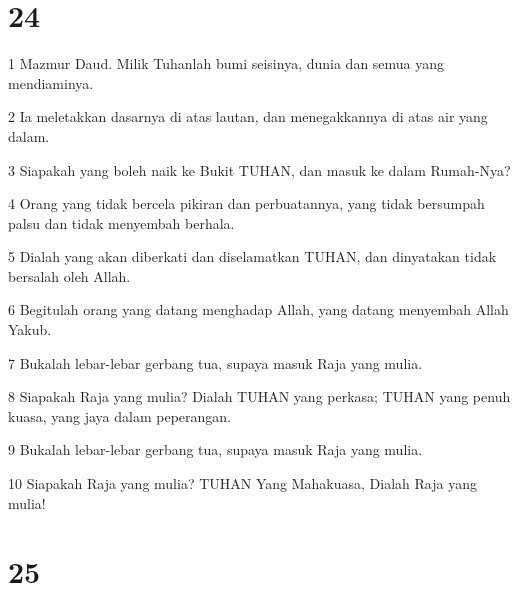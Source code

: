 \chapter{24}

\par 1 Mazmur Daud. Milik Tuhanlah bumi seisinya, dunia dan semua yang mendiaminya.
\par 2 Ia meletakkan dasarnya di atas lautan, dan menegakkannya di atas air yang dalam.
\par 3 Siapakah yang boleh naik ke Bukit TUHAN, dan masuk ke dalam Rumah-Nya?
\par 4 Orang yang tidak bercela pikiran dan perbuatannya, yang tidak bersumpah palsu dan tidak menyembah berhala.
\par 5 Dialah yang akan diberkati dan diselamatkan TUHAN, dan dinyatakan tidak bersalah oleh Allah.
\par 6 Begitulah orang yang datang menghadap Allah, yang datang menyembah Allah Yakub.
\par 7 Bukalah lebar-lebar gerbang tua, supaya masuk Raja yang mulia.
\par 8 Siapakah Raja yang mulia? Dialah TUHAN yang perkasa; TUHAN yang penuh kuasa, yang jaya dalam peperangan.
\par 9 Bukalah lebar-lebar gerbang tua, supaya masuk Raja yang mulia.
\par 10 Siapakah Raja yang mulia? TUHAN Yang Mahakuasa, Dialah Raja yang mulia!

\chapter{25}

